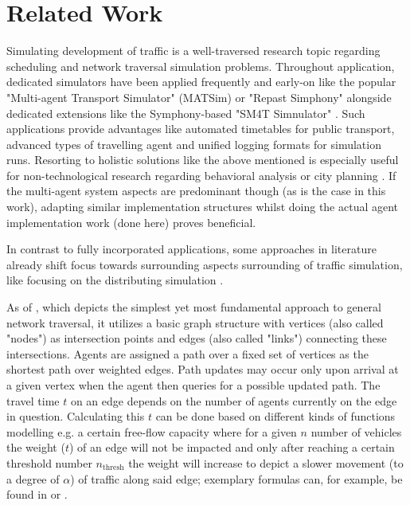 \section{Related Work}\label{sec:relatedWork}

Simulating development of traffic is a well-traversed research topic regarding scheduling and network traversal simulation problems.
Throughout application, dedicated simulators have been applied frequently and early-on like the popular "Multi-agent Transport Simulator" (MATSim) \cite{sezen2003modeling} or "Repast Simphony" \cite{zargayouna2013agent} alongside dedicated extensions like the Symphony-based "SM4T Simnulator" \cite{ksontini2016building}.
Such applications provide advantages like automated timetables for public transport, advanced types of travelling agent and unified logging formats for simulation runs.
Resorting to holistic solutions like the above mentioned is especially useful for non-technological research regarding behavioral analysis or city planning \cite{brakewood2018literature}. If the multi-agent system aspects are predominant though (as is the case in this work), adapting similar implementation structures whilst doing the actual agent implementation work (done here) proves beneficial.

In contrast to fully incorporated applications, some approaches in literature already shift focus towards surrounding aspects surrounding of traffic simulation, like focusing on the distributing simulation \cite{mastio2015towards}.

As of \cite{mastio2015towards}, which depicts the simplest yet most fundamental approach to general network traversal, it utilizes a basic graph structure with vertices (also called "nodes") as intersection points and edges (also called "links") connecting these intersections. Agents are assigned a path over a fixed set of vertices as the shortest path over weighted edges. Path updates may occur only upon arrival at a given vertex when the agent then queries for a possible updated path.
The travel time $t$ on an edge depends on the number of agents currently on the edge in question. Calculating this $t$ can be done based on different kinds of functions modelling e.g. a certain free-flow capacity where for a given $n$ number of vehicles the weight ($t$) of an edge will not be impacted and only after reaching a certain threshold number $n_{\text{thresh}}$ the weight will increase to depict a slower movement (to a degree of $\alpha$) of traffic along said edge; exemplary formulas can, for example, be found in \cite{mastio2015towards} or \cite{ksontini2016building}.

